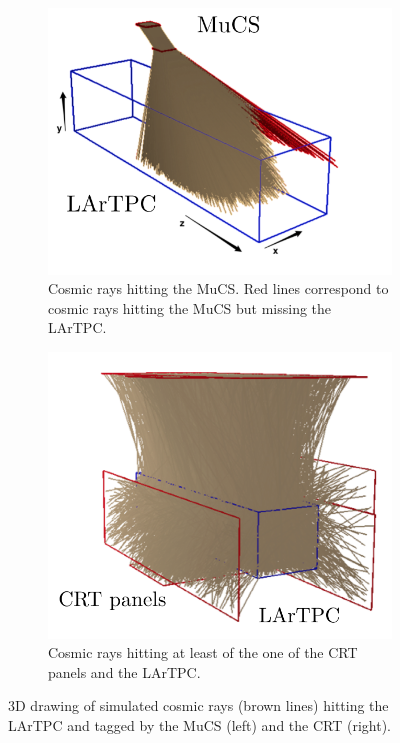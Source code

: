 \begin{figure}[htbp]
\centering
  \begin{subfigure}{0.48\textwidth}
    \includegraphics[height=0.7\linewidth]{figures/mucs.png}
    \caption{Cosmic rays hitting the MuCS. Red lines correspond to cosmic rays hitting the MuCS but missing the LArTPC.}
  \end{subfigure}\hfill
  \begin{subfigure}{0.48\textwidth}
    \begin{center}
        \includegraphics[height=0.7\linewidth]{figures/crt_panels.png}
        \caption{Cosmic rays hitting at least of the one of the CRT panels and the LArTPC.}
    \end{center}
  \end{subfigure}
    \caption{3D drawing of simulated cosmic rays (brown lines) hitting the LArTPC and tagged by the MuCS (left) and the CRT (right).}\label{fig:mucs_crt}
\end{figure}

